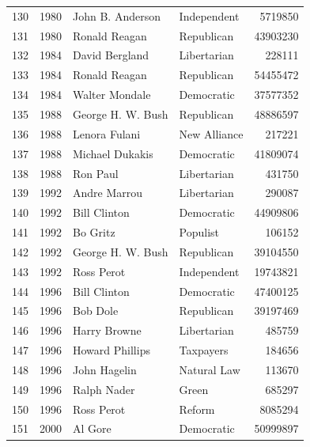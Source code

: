 \documentclass[
  letterpaper,
  DIV=11,
  numbers=noendperiod]{scrreprt}
\begin{document}
\begin{tabular}{lrllr}
130 &  1980 &        John B. Anderson &            Independent &       5719850 \\
131 &  1980 &           Ronald Reagan &             Republican &      43903230 \\
132 &  1984 &          David Bergland &            Libertarian &        228111 \\
133 &  1984 &           Ronald Reagan &             Republican &      54455472 \\
134 &  1984 &          Walter Mondale &             Democratic &      37577352 \\
135 &  1988 &       George H. W. Bush &             Republican &      48886597 \\
136 &  1988 &           Lenora Fulani &           New Alliance &        217221 \\
137 &  1988 &         Michael Dukakis &             Democratic &      41809074 \\
138 &  1988 &                Ron Paul &            Libertarian &        431750 \\
139 &  1992 &            Andre Marrou &            Libertarian &        290087 \\
140 &  1992 &            Bill Clinton &             Democratic &      44909806 \\
141 &  1992 &                Bo Gritz &               Populist &        106152 \\
142 &  1992 &       George H. W. Bush &             Republican &      39104550 \\
143 &  1992 &              Ross Perot &            Independent &      19743821 \\
144 &  1996 &            Bill Clinton &             Democratic &      47400125 \\
145 &  1996 &                Bob Dole &             Republican &      39197469 \\
146 &  1996 &            Harry Browne &            Libertarian &        485759 \\
147 &  1996 &         Howard Phillips &              Taxpayers &        184656 \\
148 &  1996 &            John Hagelin &            Natural Law &        113670 \\
149 &  1996 &             Ralph Nader &                  Green &        685297 \\
150 &  1996 &              Ross Perot &                 Reform &       8085294 \\
151 &  2000 &                 Al Gore &             Democratic &      50999897 \\

\end{tabular}
\end{document}
